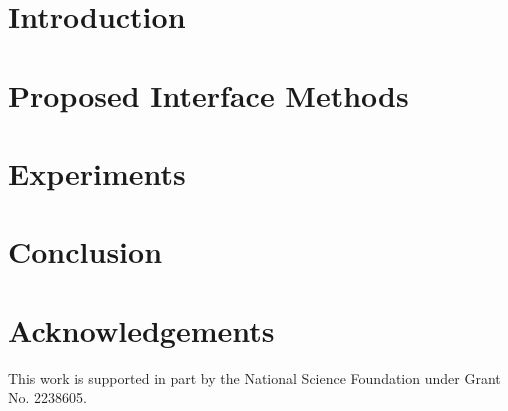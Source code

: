 \documentclass{Interspeech2024}
\newcommand{\red}[1]{\textcolor{red}{#1}}
\begin{document}
\section{Introduction}
\label{sec:intro}


\section{Proposed Interface Methods}
\label{sec:method}


\section{Experiments}
\label{sec:evaluation}


\section{Conclusion}
\label{sec:conclusion}


\section{Acknowledgements}
This work is supported in part by the National Science Foundation under Grant No. 2238605.





\end{document}
